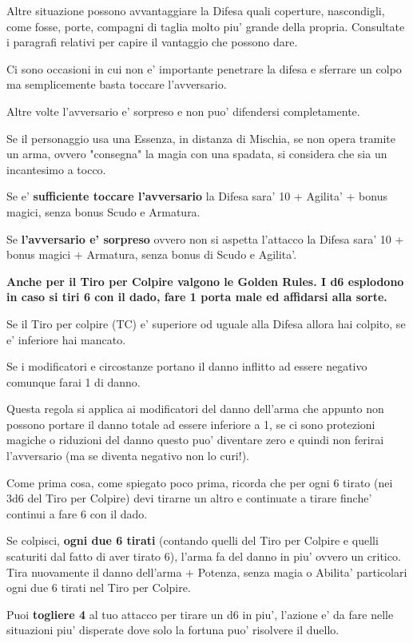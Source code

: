 \documentclass[a4paper,11pt,twoside,openany]{book}
\begin{document}
Altre situazione possono avvantaggiare la Difesa quali coperture, nascondigli, come fosse, porte, compagni di taglia molto piu' grande della propria. Consultate i paragrafi relativi per capire il vantaggio che possono dare.

Ci sono occasioni in cui non e' importante penetrare la difesa e sferrare un colpo ma semplicemente basta toccare l'avversario.

Altre volte l'avversario e' sorpreso e non puo' difendersi completamente.

Se il personaggio usa una Essenza, in distanza di Mischia, se non opera tramite un arma, ovvero "consegna" la magia con una spadata, si considera che sia un incantesimo a tocco.

Se e' \textbf{sufficiente toccare l'avversario} la Difesa sara' 10 + Agilita' + bonus magici, senza bonus Scudo e Armatura.

Se \textbf{l'avversario e' sorpreso} ovvero non si aspetta l'attacco la Difesa sara' 10 + bonus magici + Armatura, senza bonus di Scudo e Agilita'.

\textbf{Anche per il Tiro per Colpire valgono le Golden Rules. I d6 esplodono in caso si tiri 6 con il dado, fare 1 porta male ed affidarsi alla sorte.}

Se il Tiro per colpire (TC) e' superiore od uguale alla Difesa allora hai colpito, se e' inferiore hai mancato.

Se i modificatori e circostanze portano il danno inflitto ad essere negativo comunque farai 1 di danno.

Questa regola si applica ai modificatori del danno dell'arma che appunto non possono portare il danno totale ad essere inferiore a 1, se ci sono protezioni magiche o riduzioni del danno questo puo' diventare zero e quindi non ferirai l'avversario (ma se diventa negativo non lo curi!).

Come prima cosa, come spiegato poco prima, ricorda che per ogni 6 tirato (nei 3d6 del Tiro per Colpire) devi tirarne un altro e continuate a tirare finche' continui a fare 6 con il dado.

Se colpisci, \textbf{ogni due 6 tirati} (contando quelli del Tiro per Colpire e quelli scaturiti dal fatto di aver tirato 6), l'arma fa del danno in piu' ovvero un critico. Tira nuovamente il danno dell'arma + Potenza, senza magia o Abilita' particolari ogni due 6 tirati nel Tiro per Colpire.

Puoi \textbf{togliere 4} al tuo attacco per tirare un d6 in piu', l'azione e' da fare nelle situazioni piu' disperate dove solo la fortuna puo' risolvere il duello.
\end{document}
